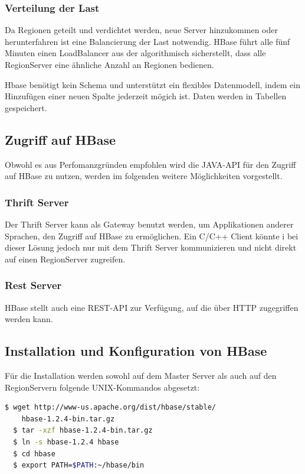 \subsubsection{Verteilung der Last}
Da Regionen geteilt und verdichtet werden, neue Server hinzukommen oder herunterfahren ist eine Balancierung der Last notwendig. HBase führt alle fünf Minuten einen LoadBalancer aus der algorithmisch sicherstellt, dass alle RegionServer eine ähnliche Anzahl an Regionen bedienen. 




Hbase benötigt kein Schema und unterstützt ein flexibles Datenmodell, indem ein Hinzufügen einer neuen Spalte jederzeit mögich ist. Daten werden in Tabellen gespeichert.

\subsection{Zugriff auf HBase}
Obwohl es aus Perfomanzgründen empfohlen wird die JAVA-API für den Zugriff auf HBase zu nutzen, werden im folgenden weitere Möglichkeiten vorgestellt.

\subsubsection{Thrift Server}
Der Thrift Server kann als Gateway benutzt werden, um Applikationen  anderer Sprachen, den Zugriff auf HBase zu ermöglichen. Ein C/C++ Client könnte i bei dieser Lösung jedoch nur mit dem Thrift Server kommunizieren und nicht direkt auf einen RegionServer zugreifen.

\subsubsection{Rest Server}
HBase stellt auch eine REST-API zur Verfügung, auf die über HTTP zugegriffen werden kann.



\subsection{Installation und Konfiguration von HBase}
Für die Installation werden sowohl auf dem Master Server als auch auf den RegionServern folgende UNIX-Kommandos abgesetzt:
\noindent 
\begin{lstlisting}[language=bash]
  $ wget http://www-us.apache.org/dist/hbase/stable/
    hbase-1.2.4-bin.tar.gz
  $ tar -xzf hbase-1.2.4-bin.tar.gz
  $ ln -s hbase-1.2.4 hbase
  $ cd hbase
  $ export PATH=$PATH:~/hbase/bin
\end{lstlisting}

